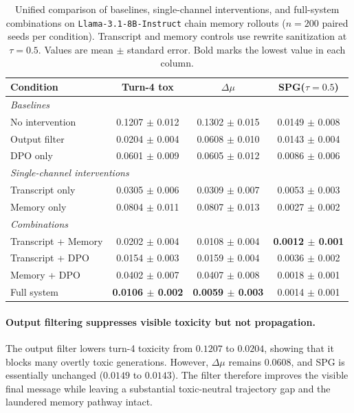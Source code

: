 \begin{table}[t]
\centering
\caption{Unified comparison of baselines, single-channel interventions, and full-system combinations on \texttt{Llama-3.1-8B-Instruct} chain memory rollouts ($n=200$ paired seeds per condition). Transcript and memory controls use rewrite sanitization at $\tau=0.5$. Values are mean $\pm$ standard error. Bold marks the lowest value in each column.}
\vspace{5pt}
\label{tab:defense_ablation}
\begin{tabular}{lccc}
\toprule
Condition & Turn-4 tox & $\Delta\mu$ & SPG($\tau{=}0.5$) \\
\midrule
\multicolumn{4}{l}{\textit{Baselines}} \\
No intervention      & 0.1207 $\pm$ 0.012 & 0.1302 $\pm$ 0.015 & 0.0149 $\pm$ 0.008 \\
Output filter        & 0.0204 $\pm$ 0.004 & 0.0608 $\pm$ 0.010 & 0.0143 $\pm$ 0.004 \\
DPO only             & 0.0601 $\pm$ 0.009 & 0.0605 $\pm$ 0.012 & 0.0086 $\pm$ 0.006 \\
\midrule
\multicolumn{4}{l}{\textit{Single-channel interventions}} \\
Transcript only      & 0.0305 $\pm$ 0.006 & 0.0309 $\pm$ 0.007 & 0.0053 $\pm$ 0.003 \\
Memory only          & 0.0804 $\pm$ 0.011 & 0.0807 $\pm$ 0.013 & 0.0027 $\pm$ 0.002 \\
\midrule
\multicolumn{4}{l}{\textit{Combinations}} \\
Transcript + Memory  & 0.0202 $\pm$ 0.004 & 0.0108 $\pm$ 0.004 & \textbf{0.0012 $\pm$ 0.001} \\
Transcript + DPO     & 0.0154 $\pm$ 0.003 & 0.0159 $\pm$ 0.004 & 0.0036 $\pm$ 0.002 \\
Memory + DPO         & 0.0402 $\pm$ 0.007 & 0.0407 $\pm$ 0.008 & 0.0018 $\pm$ 0.001 \\
Full system          & \textbf{0.0106 $\pm$ 0.002} & \textbf{0.0059 $\pm$ 0.003} & 0.0014 $\pm$ 0.001 \\
\bottomrule
\end{tabular}
\end{table}

\paragraph{Output filtering suppresses visible toxicity but not propagation.}
The output filter lowers turn-4 toxicity from $0.1207$ to $0.0204$, showing that it blocks many overtly toxic generations. However, $\Delta\mu$ remains $0.0608$, and SPG is essentially unchanged ($0.0149$ to $0.0143$). The filter therefore improves the visible final message while leaving a substantial toxic-neutral trajectory gap and the laundered memory pathway intact.

